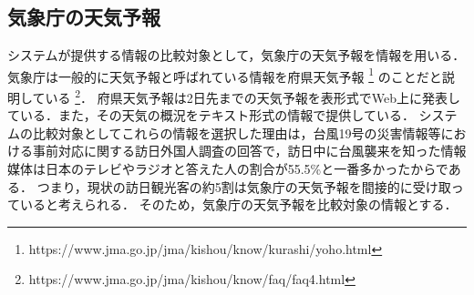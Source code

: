 \subsection{気象庁の天気予報}
システムが提供する情報の比較対象として，気象庁の天気予報を情報を用いる．
気象庁は一般的に天気予報と呼ばれている情報を府県天気予報 \footnote{https://www.jma.go.jp/jma/kishou/know/kurashi/yoho.html} のことだと説明している \footnote{https://www.jma.go.jp/jma/kishou/know/faq/faq4.html}．
府県天気予報は2日先までの天気予報を表形式でWeb上に発表している．また，その天気の概況をテキスト形式の情報で提供している．
システムの比較対象としてこれらの情報を選択した理由は，台風19号の災害情報等における事前対応に関する訪日外国人調査\cite{Typhoon}の回答で，訪日中に台風襲来を知った情報媒体は日本のテレビやラジオと答えた人の割合が55.5\%と一番多かったからである．
つまり，現状の訪日観光客の約5割は気象庁の天気予報を間接的に受け取っていると考えられる．
そのため，気象庁の天気予報を比較対象の情報とする．
